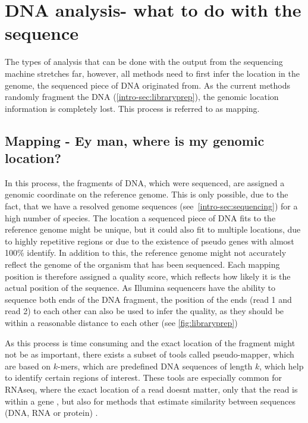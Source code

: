 \section[DNA analysis]{DNA analysis- what to do with the sequence}
\label{intro-sec:analysis}
The types of analysis that can be done with the output from the sequencing machine stretches far,  however, all methods need to first infer the location in the genome, the sequenced piece of DNA originated from. As the current methods randomly fragment the DNA (\autoref{intro-sec:libraryprep}), the genomic location information is completely lost. This process is referred to as mapping.

\subsection[Mapping]{Mapping - Ey man, where is my genomic location?}
\label{intro-sec:mapping}
In this process, the fragments of DNA, which were sequenced, are assigned a genomic coordinate on the reference genome. This is only possible, due to the fact, that we have a resolved genome sequences (see~\autoref{intro-sec:sequencing}) for a high number of species. The location a sequenced piece of DNA fits to the reference genome might be unique, but it could also fit to multiple locations, due to highly repetitive regions or due to the existence of pseudo genes with almost 100\% identify. In addition to this, the reference genome might not accurately reflect the genome of the organism that has been sequenced. Each mapping position is therefore assigned a quality score, which reflects how likely it is the actual position of the sequence. As Illumina sequencers have the ability to sequence both ends of the DNA fragment, the position of the ends (read 1 and read 2) to each other can also be used to infer the quality, as they should be within a reasonable distance to each other (see \autoref{fig:libraryprep})

As this process is time consuming and the exact location of the fragment might not be as important, there exists a subset of tools called pseudo-mapper, which are based on $k$-mers, which are predefined DNA sequences of length $k$, which help to identify certain regions of interest. These tools are especially common for RNAseq, where the exact location of a read doesnt matter, only that the read is within a gene \cite{Bray2016,Patro2017}, but also for methods that estimate similarity between sequences (DNA, RNA or protein) \cite{Ondov2016,Luczak2017}.

